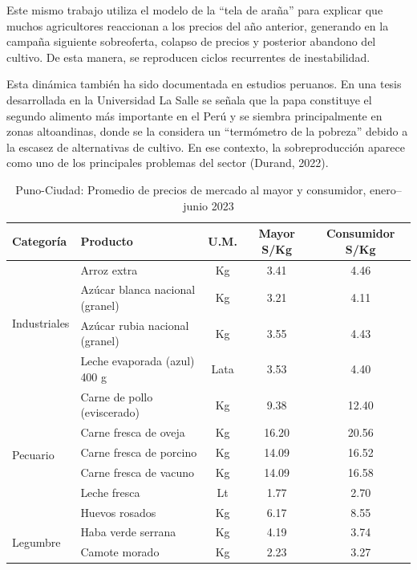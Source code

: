 \documentclass[12pt, a4paper]{report}
\begin{document}
Este mismo trabajo utiliza el modelo de la \enquote{tela de araña} para explicar que muchos agricultores reaccionan a los precios del año anterior, generando en la campaña siguiente sobreoferta, colapso de precios y posterior abandono del cultivo. De esta manera, se reproducen ciclos recurrentes de inestabilidad.

Esta dinámica también ha sido documentada en estudios peruanos. En una tesis desarrollada en la Universidad La Salle se señala que la papa constituye el segundo alimento más importante en el Perú y se siembra principalmente en zonas altoandinas, donde se la considera un \enquote{termómetro de la pobreza} debido a la escasez de alternativas de cultivo. En ese contexto, la sobreproducción aparece como uno de los principales problemas del sector (Durand, 2022).

\begin{table}[h]
\centering
\caption{Puno-Ciudad: Promedio de precios de mercado al mayor y consumidor, enero--junio 2023}
\vspace{6pt}
\begin{tabular}{llccc}
\toprule
\textbf{Categoría} & \textbf{Producto} & \textbf{U.M.} & \textbf{Mayor S/Kg} & \textbf{Consumidor S/Kg} \\
\midrule
\multirow{4}{*}{Industriales}
 & Arroz extra                      & Kg   & 3.41  & 4.46  \\
 & Azúcar blanca nacional (granel)  & Kg   & 3.21  & 4.11  \\
 & Azúcar rubia nacional (granel)   & Kg   & 3.55  & 4.43  \\
 & Leche evaporada (azul) 400 g     & Lata & 3.53  & 4.40  \\
\midrule
\multirow{6}{*}{Pecuario}
 & Carne de pollo (eviscerado)      & Kg   & 9.38  & 12.40 \\
 & Carne fresca de oveja            & Kg   & 16.20 & 20.56 \\
 & Carne fresca de porcino          & Kg   & 14.09 & 16.52 \\
 & Carne fresca de vacuno           & Kg   & 14.09 & 16.58 \\
 & Leche fresca                     & Lt   & 1.77  & 2.70  \\
 & Huevos rosados                   & Kg   & 6.17  & 8.55  \\
\midrule
\multirow{2}{*}{Legumbre}
 & Haba verde serrana               & Kg   & 4.19  & 3.74  \\
 & Camote morado                    & Kg   & 2.23  & 3.27  \\

\end{tabular}
\end{table}
\end{document}
